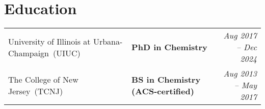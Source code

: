 \documentclass[letterpaper,10pt]{article}
\makeatletter
\newcommand{\sectionspace}{
\vspace{-17pt}
}
\newcommand{\subheadingtitlevspace}{
\vspace{-3pt}
}
\newcommand{\titleItem}[1]{
  \textbf{#1}
}
\newcommand{\resumeProjectHeading}[2]{
    \item
    \begin{tabular*}{0.97\textwidth}{l@{\extracolsep{\fill}}r}
      #1 & \textit{ #2} \\
    \end{tabular*}\vspace{-9pt}
}
\newcommand{\resumeSubHeadingListStart}{\subheadingtitlevspace\begin{itemize}[leftmargin=0.15in, label={}]}
\newcommand{\resumeSubHeadingListEnd}{\end{itemize}}
\makeatother
\begin{document}
          
\section{\textcolor{color1}{Education}}
\vspace{-3pt}
{
	\setlength\tabcolsep{0pt}
	\begin{tabular*}{\linewidth}{@{\extracolsep{\fill}} llr}
		University of Illinois at Urbana-Champaign~(UIUC) & \textbf{PhD in Chemistry} & \textcolor{color2}{\textit{Aug 2017 -- Dec 2024}}\\
		The College of New Jersey~(TCNJ) & \textbf{BS in Chemistry (ACS-certified)} & \textcolor{color2}{\textit{Aug 2013 -- May 2017}}\\
	\end{tabular*}
}
\sectionspace
\vspace{3pt}

\end{document}

